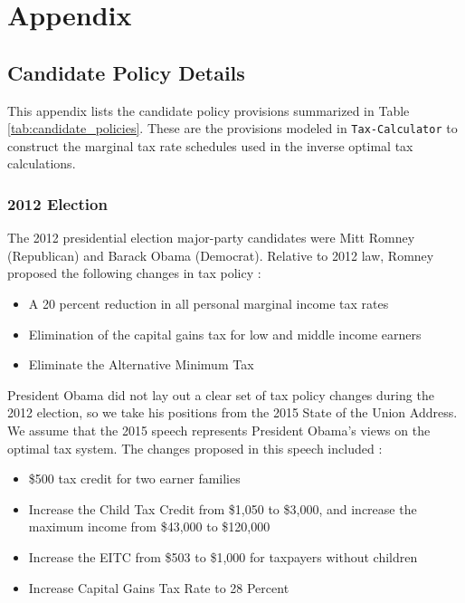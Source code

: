 \documentclass[12pt]{article}
\begin{document}

\newpage

\section{Appendix}

\subsection{Candidate Policy Details}\label{app:candidate_policy_details}

This appendix lists the candidate policy provisions summarized in Table \ref{tab:candidate_policies}.  These are the provisions modeled in \texttt{Tax-Calculator} to construct the marginal tax rate schedules used in the inverse optimal tax calculations.

\subsubsection{2012 Election}

The 2012 presidential election major-party candidates were Mitt Romney (Republican) and Barack Obama (Democrat). Relative to 2012 law, Romney proposed the following changes in tax policy \citep{Romney}:
\begin{itemize}
    \item A 20 percent reduction in all personal marginal income tax rates
    \item Elimination of the capital gains tax for low and middle income earners
    \item Eliminate the Alternative Minimum Tax
\end{itemize}

President Obama did not lay out a clear set of tax policy changes during the 2012 election, so we take his positions from the 2015 State of the Union Address.  We assume that the 2015 speech represents President Obama's views on the optimal tax system.  The changes proposed in this speech included \citep{Obama}:
\begin{itemize}
    \item \$500 tax credit for two earner families
    \item Increase the Child Tax Credit from \$1,050 to \$3,000, and increase the maximum income from \$43,000 to \$120,000
    \item Increase the EITC from \$503 to \$1,000 for taxpayers without children
    \item Increase Capital Gains Tax Rate to 28 Percent
\end{itemize}
\end{document}
